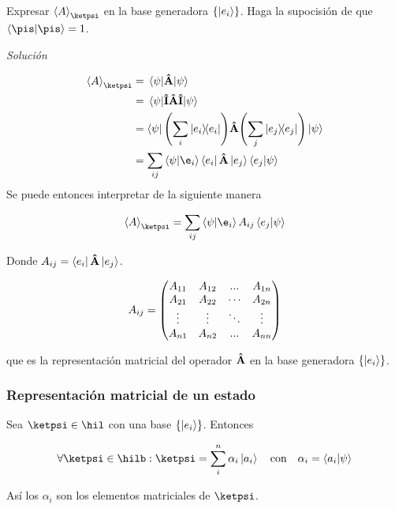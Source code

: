          \begin{example}
             Expresar $\expval{A}_{\ketpsi}$ en la base generadora $\qty{\ket{e_i}}$. Haga la supocisión de que $\braket{\pis}=1$.

             \textit{Solución}

             \begin{align*}
                 \expval{A}_{\ketpsi} & =\expval{\vu{A}}{\psi}                                                        \\
                                      & =\expval{\vu{I}\vu{A}\vu{I}}{\psi}                                            \\
                                      & =\bra{\psi}\qty\Bigg(\sum_i\op{e_i})\vu{A}\qty\Bigg(\sum_j\op{e_j})\ket{\psi} \\
                                      & =\sum_{ij}\braket{\psi}{\e_i}\bra{e_i}\vu{A}\ket{e_j}\braket{e_j}{\psi}
             \end{align*}
             Se puede entonces interpretar de la siguiente manera

             $$
                 \expval{A}_{\ketpsi}=\sum_{ij}\braket{\psi}{\e_i}A_{ij}\braket{e_j}{\psi}
             $$

             Donde $A_{ij}=\bra{e_i}\vu{A}\ket{e_j}$.

             $$
                 A_{ij}=\mqty(A_{11}&A_{12}&...&A_{1n}\\A_{21}&A_{22}&\cdots&A_{2n}\\
                 \vdots&\vdots&\ddots&\vdots\\A_{n1}&A_{n2}&...&A_{nn})
             $$

             que es la representación matricial del operador $\vu{A}$ en la base generadora $\qty{\ket{e_i}}$.
         \end{example}

     \subsubsection{Representación matricial de un estado \ketpsi}
         Sea $\ketpsi\in\hil$ con una base $\qty{\ket{e_i}}$. Entonces

         $$
             \forall\ketpsi\in\hilb:\ketpsi=\sum_i^n\alpha_i\ket{a_i}\qq{con}\alpha_i=\braket{a_i}{\psi}
         $$

         Así los $\alpha_i$ son los elementos matriciales de $\ketpsi$.


